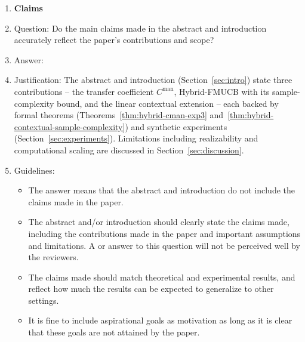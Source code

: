 \documentclass{article}
\begin{document}
\begin{enumerate}

\item {\bf Claims}
    \item[] Question: Do the main claims made in the abstract and introduction accurately reflect the paper's contributions and scope?
    \item[] Answer: \answerYes{}
    \item[] Justification: The abstract and introduction (Section~\ref{sec:intro}) state three contributions -- the transfer coefficient $C^{\mathrm{man}}$, Hybrid-FMUCB with its sample-complexity bound, and the linear contextual extension -- each backed by formal theorems (Theorems~\ref{thm:hybrid-cman-exp3} and~\ref{thm:hybrid-contextual-sample-complexity}) and synthetic experiments (Section~\ref{sec:experiments}). Limitations including realizability and computational scaling are discussed in Section~\ref{sec:discussion}.
    \item[] Guidelines:
    \begin{itemize}
        \item The answer \answerNA{} means that the abstract and introduction do not include the claims made in the paper.
        \item The abstract and/or introduction should clearly state the claims made, including the contributions made in the paper and important assumptions and limitations. A \answerNo{} or \answerNA{} answer to this question will not be perceived well by the reviewers.
        \item The claims made should match theoretical and experimental results, and reflect how much the results can be expected to generalize to other settings.
        \item It is fine to include aspirational goals as motivation as long as it is clear that these goals are not attained by the paper.
    \end{itemize}


\end{enumerate}
\end{document}
